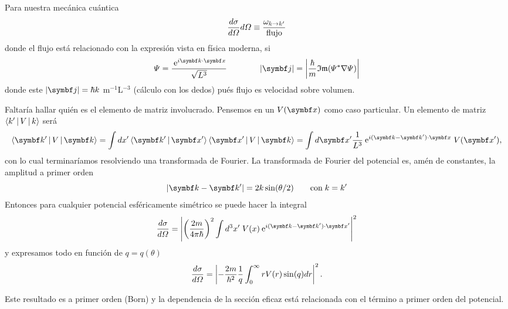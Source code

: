 \documentclass[10pt,oneside]{CBFT_book}
\begin{document}
Para nuestra mecánica cuántica
\[
	\frac{d^{\hspace{-0.05em}} {\sigma}}{d {\Omega}^{\hspace{-0.05em}}}d\Omega \equiv \frac{\omega_{k \to k'}}{\text{ flujo }}
\]
donde el flujo está relacionado con la expresión vista en física moderna, si
\[
	\Psi = \frac{ \euler^{ i \pe{k}{x} } }{ \sqrt{ L^3 } } \qquad \qquad 
	| \vb j | =  \left| \frac{\hbar}{m} \mathfrak{Im}( \Psi^* \nabla \Psi ) \right|
\]
donde este $|\vb j| = \hbar k $ m$^{-1}$L$^{-3}$ (cálculo con los dedos) pués flujo es velocidad sobre volumen.

Faltaría hallar quién es el elemento de matriz involucrado. Pensemos en un $V(\vb x)$ como caso particular.
Un elemento de matriz $\Braket{k'|V|k}$ será 
\[
	\Braket{\vb{k}'|V|\vb{k}} = \int dx'\Braket{\vb{k}'|\vb{x}'} \Braket{\vb{x}'|V|\vb{k}} =
	\int d\vb{x}' \frac{1}{L^3} \euler^{i (\vb{k}-\vb{k}')\cdot \vb{x}} \; V(\vb{x}'),
\]
con lo cual terminaríamos resolviendo una transformada de Fourier.
La transformada de Fourier del potencial es, amén de constantes, la amplitud a primer orden 
\[
	|\vb{k} - \vb{k}'| = 2k\sin(\theta/2) \qquad \text{con} \; k=k' 
\]
Entonces para cualquier potencial esféricamente simétrico se puede hacer la integral 
\[
	\dtot{\sigma}{\Omega} =
	\left|\left( \frac{2m}{4\pi\hbar}\right)^2 \int d^3x'\;V(x) \euler^{i(\vb{k}-\vb{k}')\cdot\vb{x}'}\right|^2
\]
y expresamos todo en función de $q=q(\theta)$
\[
	\frac{d^{\hspace{-0.05em}} {\sigma}}{d {\Omega}^{\hspace{-0.05em}}} =
	\left| -\frac{2m}{\hbar^2} \frac{1}{q} \int_0^\infty rV(r)\sin(q) dr \right|^2.
\]

Este resultado es a primer orden (Born) y la dependencia de la sección eficaz está relacionada con el término
a primer orden del potencial.
\end{document}
